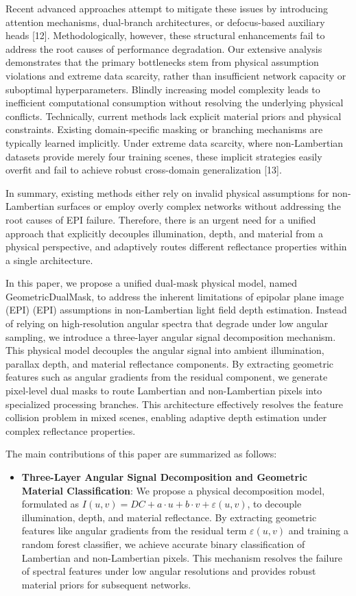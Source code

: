 Recent advanced approaches attempt to mitigate these issues by introducing attention mechanisms, dual-branch architectures, or defocus-based auxiliary heads [12]. Methodologically, however, these structural enhancements fail to address the root causes of performance degradation. Our extensive analysis demonstrates that the primary bottlenecks stem from physical assumption violations and extreme data scarcity, rather than insufficient network capacity or suboptimal hyperparameters. Blindly increasing model complexity leads to inefficient computational consumption without resolving the underlying physical conflicts. Technically, current methods lack explicit material priors and physical constraints. Existing domain-specific masking or branching mechanisms are typically learned implicitly. Under extreme data scarcity, where non-Lambertian datasets provide merely four training scenes, these implicit strategies easily overfit and fail to achieve robust cross-domain generalization [13].

In summary, existing methods either rely on invalid physical assumptions for non-Lambertian surfaces or employ overly complex networks without addressing the root causes of EPI failure. Therefore, there is an urgent need for a unified approach that explicitly decouples illumination, depth, and material from a physical perspective, and adaptively routes different reflectance properties within a single architecture.

In this paper, we propose a unified dual-mask physical model, named GeometricDualMask, to address the inherent limitations of epipolar plane image (EPI) (EPI) assumptions in non-Lambertian light field depth estimation. Instead of relying on high-resolution angular spectra that degrade under low angular sampling, we introduce a three-layer angular signal decomposition mechanism. This physical model decouples the angular signal into ambient illumination, parallax depth, and material reflectance components. By extracting geometric features such as angular gradients from the residual component, we generate pixel-level dual masks to route Lambertian and non-Lambertian pixels into specialized processing branches. This architecture effectively resolves the feature collision problem in mixed scenes, enabling adaptive depth estimation under complex reflectance properties.

The main contributions of this paper are summarized as follows:

\begin{itemize}\item \textbf{Three-Layer Angular Signal Decomposition and Geometric Material Classification}: We propose a physical decomposition model, formulated as $I(u,v) = DC + a \cdot u + b \cdot v + \varepsilon(u,v)$, to decouple illumination, depth, and material reflectance. By extracting geometric features like angular gradients from the residual term $\varepsilon(u,v)$ and training a random forest classifier, we achieve accurate binary classification of Lambertian and non-Lambertian pixels. This mechanism resolves the failure of spectral features under low angular resolutions and provides robust material priors for subsequent networks.\end{itemize}

